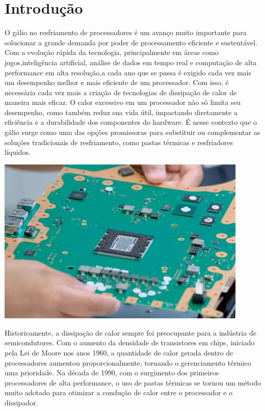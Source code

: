 \documentclass{article}
\begin{document}
\tableofcontents
\newpage
\nocite{*}
\section{Introdução}
O gálio no resfriamento de processadores é um avanço muito importante para solucionar a grande demanda por poder de processamento eficiente e sustentável. Com a evolução rápida da tecnologia, principalmente em áreas como jogos,inteligência artificial, análise de dados em tempo real e computação de alta performance em alta resolução,a cada ano que se passa é exigido cada vez mais um desempenho melhor e mais eficiente de um processador. 
Com isso, é necessária cada vez mais a criação de tecnologias de dissipação de calor de maneira mais eficaz. O calor excessivo em um processador não só limita seu desempenho, como também reduz sua vida útil, impactando diretamente a eficiência e a durabilidade dos componentes do hardware. É nesse contexto que o gálio surge como uma das opções promissoras para substituir ou complementar as soluções tradicionais de resfriamento, como pastas térmicas e resfriadores líquidos.
\begin{adjustbox}{center,nofloat=figure,vspace=\bigskipamount}
    \centering
    \includegraphics[width=12cm]{mobo.png}
\end{adjustbox}
Historicamente, a dissipação de calor sempre foi preocupante para a indústria de semicondutores. Com o aumento da densidade de transistores em chips, iniciado pela Lei de Moore nos anos 1960, a quantidade de calor gerada dentro de processadores aumentou proporcionalmente, tornando o gerenciamento térmico uma prioridade. Na década de 1990, com o surgimento dos primeiros processadores de alta performance, o uso de pastas térmicas se tornou um método muito adotado para otimizar a condução de calor entre o processador e o dissipador. 
\end{document}
